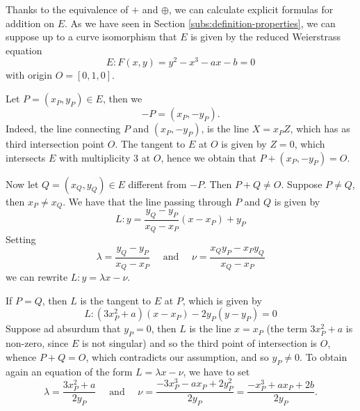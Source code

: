
Thanks to the equivalence of $+$ and $\oplus$, we can calculate explicit
formulas for addition on $E$. As we have seen in
Section \ref{subs:definition-properties}, we can suppose up to a curve isomorphism
that $E$ is given by the reduced Weierstrass equation
\begin{equation*}
	E: F(x, y) = y^2 - x^3 - ax - b = 0
\end{equation*}
with origin $O = [0, 1, 0]$.

Let $P = (x_P, y_P) \in E$, then we
\begin{equation*}
	-P = (x_P, -y_P).
\end{equation*}
Indeed, the line connecting $P$ and $(x_P, -y_P)$, is the line
$X = x_PZ$, which has as third intersection point $O$.
The tangent to $E$ at $O$ is given by $Z = 0$,
which intersects $E$ with multiplicity 3 at $O$,
hence we obtain that $P+(x_P, -y_P) = O$.

Now let $Q = (x_Q, y_Q) \in E$ different from $-P$. Then $P + Q \neq O$.
Suppose $P \neq Q$, then $x_P \neq x_Q$. 
We have that the line passing through $P$ and $Q$ is given by
\begin{equation*}
	L: y = \frac{y_Q - y_P}{x_Q - x_P}(x - x_P) + y_P
\end{equation*}
Setting 
\begin{equation*}
	\lambda = \frac{y_Q - y_P}{x_Q - x_P}
	\quad\textrm{ and }\quad
	\nu = \frac{x_Qy_P - x_Py_Q}{x_Q - x_P}
\end{equation*}
we can rewrite $L: y = \lambda x - \nu$.

If $P = Q$, then $L$ is the tangent to $E$ at $P$, which is given by
\begin{equation*}
	L: (3x_P^2 + a)(x - x_P) - 2y_P(y - y_P) = 0
\end{equation*}
Suppose ad absurdum that $y_P = 0$,
then $L$ is the line $x = x_P$ (the term $3x_P^2 + a$ is non-zero, since
$E$ is not singular) and so the third point of intersection
is $O$, whence $P + Q = O$, which contradicts our assumption, and so 
$y_P \neq 0$.
To obtain again an equation of the form $L = \lambda x - \nu$, we have to set
\begin{equation*}
	\lambda = \frac{3x_P^2 + a}{2y_P}
	\quad\textrm{ and }\quad
	\nu = \frac{-3x_P^3 - ax_P + 2y_P^2}{2y_P}
	= \frac{-x_P^3 + ax_P + 2b}{2y_P}.
\end{equation*}

